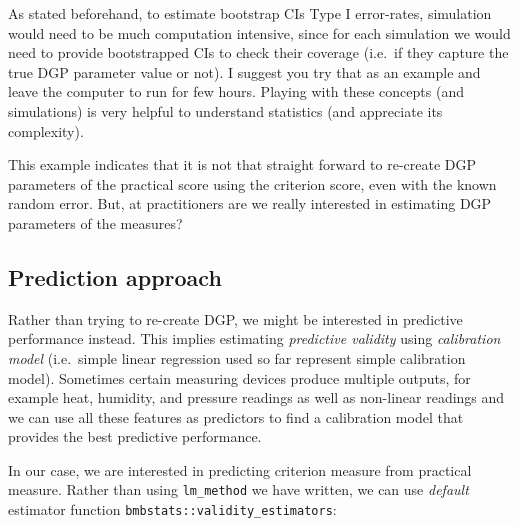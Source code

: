 \documentclass[
]{book}
\begin{document}
As stated beforehand, to estimate bootstrap CIs Type I error-rates, simulation would need to be much computation intensive, since for each simulation we would need to provide bootstrapped CIs to check their coverage (i.e.~if they capture the true DGP parameter value or not). I suggest you try that as an example and leave the computer to run for few hours. Playing with these concepts (and simulations) is very helpful to understand statistics (and appreciate its complexity).

This example indicates that it is not that straight forward to re-create DGP parameters of the practical score using the criterion score, even with the known random error. But, at practitioners are we really interested in estimating DGP parameters of the measures?

\hypertarget{prediction-approach}{%
\subsection{Prediction approach}\label{prediction-approach}}

Rather than trying to re-create DGP, we might be interested in predictive performance instead. This implies estimating \emph{predictive validity} using \emph{calibration model} (i.e.~simple linear regression used so far represent simple calibration model). Sometimes certain measuring devices produce multiple outputs, for example heat, humidity, and pressure readings as well as non-linear readings and we can use all these features as predictors to find a calibration model that provides the best predictive performance.

In our case, we are interested in predicting criterion measure from practical measure. Rather than using \texttt{lm\_method} we have written, we can use \emph{default} estimator function \texttt{bmbstats::validity\_estimators}:
\end{document}
